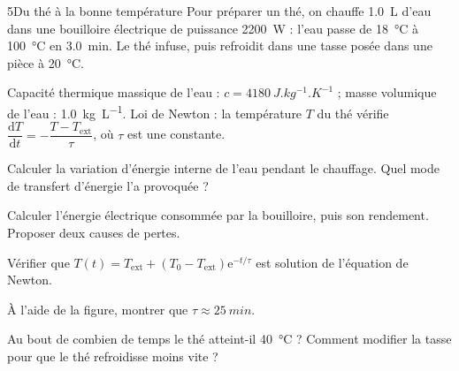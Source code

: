 \begin{exoBac}{5}{Du thé à la bonne température}
Pour préparer un thé, on chauffe \qty{1,0}{L} d'eau dans une bouilloire électrique de puissance \qty{2200}{W} : l'eau passe de \qty{18}{\degreeCelsius} à
\qty{100}{\degreeCelsius} en \qty{3,0}{min}. Le thé infuse, puis refroidit dans une tasse posée dans une pièce à \qty{20}{\degreeCelsius}.
\begin{donnees}
Capacité thermique massique de l'eau : $c=\qty{4180}{J.kg^{-1}.K^{-1}}$ ; masse volumique de l'eau : \qty{1,0}{kg.L^{-1}}. Loi de Newton :
la température $T$ du thé vérifie $\dfrac{\mathrm{d}T}{\mathrm{d}t}=-\dfrac{T-T_\mathrm{ext}}{\tau}$, où $\tau$ est une constante.
\end{donnees}
\begin{questions}
\item Calculer la variation d'énergie interne de l'eau pendant le chauffage. Quel mode de transfert d'énergie l'a
provoquée ?
\item Calculer l'énergie électrique consommée par la bouilloire, puis son rendement. Proposer deux causes de pertes.
\item Vérifier que $T(t)=T_\mathrm{ext}+\left(T_0-T_\mathrm{ext}\right)\mathrm{e}^{-t/\tau}$ est solution de l'équation de Newton.
\item À l'aide de la figure, montrer que $\tau\approx\qty{25}{min}$.
\item \initiative Au bout de combien de temps le thé atteint-il \qty{40}{\degreeCelsius} ? Comment modifier la tasse pour que le thé refroidisse
moins vite ?
\end{questions}
\end{exoBac}
